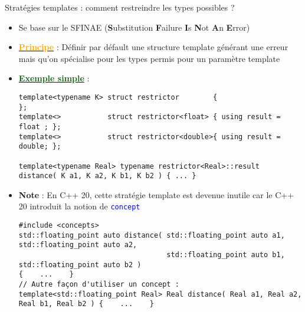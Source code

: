 \documentclass[compress,10pt,aspectratio=169]{beamer}
\begin{document}
\begin{frame}[fragile]{Stratégies templates : comment restreindre les types possibles ?}
\scriptsize
  
  \begin{itemize}
  \item Se base sur le SFINAE (\textbf{S}ubstitution \textbf{F}ailure 
  \textbf{I}s \textbf{N}ot \textbf{A}n \textbf{E}rror)
  \item \underline{\textcolor{orange}{\bf Principe}} : 
  Définir par défault une structure template générant une erreur mais qu'on
  spécialise pour les types permis pour un paramètre template
  \item \underline{\textcolor{DarkGreen}{\bf Exemple simple}} : 
\begin{verbatim}
template<typename K> struct restrictor        {                        };
template<>           struct restrictor<float> { using result = float ; };
template<>           struct restrictor<double>{ using result = double; };
        
template<typename Real> typename restrictor<Real>::result
distance( K a1, K a2, K b1, K b2 ) { ... }
\end{verbatim}
  \item \textbf{Note} : En C++ 20, cette stratégie template est devenue inutile 
   car le C++ 20 introduit la notion de \texttt{\textcolor{blue}{concept}}
\begin{verbatim}
#include <concepts>
std::floating_point auto distance( std::floating_point auto a1, std::floating_point auto a2,
                                   std::floating_point auto b1, std::floating_point auto b2 ) 
{    ...    }
// Autre façon d'utiliser un concept :
template<std::floating_point Real> Real distance( Real a1, Real a2, Real b1, Real b2 ) {    ...    }
\end{verbatim}
\end{itemize}
\end{frame}
  
\end{document}
